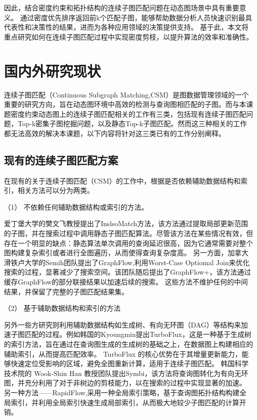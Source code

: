 因此，结合密度约束和拓扑结构的连续子图匹配问题在动态图场景中具有重要意义。
通过密度优先排序返回前k个匹配子图，能够帮助数据分析人员快速识别最具代表性和决策性的结果，进而为各种应用领域的决策提供支持。
基于此，本文将重点研究如何在连续子图匹配过程中实现密度剪枝，以提升算法的效率和准确性。
\section{国内外研究现状}
连续子图匹配（Continuous Subgraph Matching,CSM）是图数据管理领域的一个重要的研究方向，旨在动态图环境中高效的检测与查询图相匹配的子图。而与本课题密度约束动态图上的连续子图匹配相关的工作有三类，包括现有连续子图匹配问题，Top-k密集子图挖掘问题，以及静态Top-k子图匹配。然而这三种相关的工作都无法高效的解决本课题，以下内容将针对这三类已有的工作分别阐释。
\subsection{现有的连续子图匹配方案}
在现有的关于连续子图匹配（CSM）的工作\cite{csm-sjtree-DBLP:conf/edbt/ChoudhuryHCAF15,csm-IncIsoMatch-DBLP:conf/sigmod/FanLLTWW11,csm-graphflow-DBLP:conf/sigmod/KankanamgeSMCS17,csm-turboflux-DBLP:conf/sigmod/KimSHLHCSJ18,csm-graphflowpp-DBLP:journals/tods/MhedhbiKS21,csm-symbi-DBLP:journals/pvldb/MinPPGIH21,csm-rapidflow-DBLP:journals/pvldb/SunSHL22}中，根据是否依赖辅助数据结构和索引，相关方法可以分为两类。

（1） 不依赖任何辅助数据结构或索引的方法。

爱丁堡大学的樊文飞教授提出了InslsoMatch\cite{csm-IncIsoMatch-DBLP:conf/sigmod/FanLLTWW11}方法，该方法通过提取局部更新范围的子图，并在搜索过程中调用静态子图匹配算法。尽管该方法在某些情况有效，但存在一个明显的缺点：静态算法单次调用的查询延迟很高，因为它通常需要对整个图构建复杂索引或者进行全图遍历，从而使得查询复杂度高。
另一方面，加拿大滑铁卢大学的Semih团队提出了GraphFlow\cite{csm-graphflow-DBLP:conf/sigmod/KankanamgeSMCS17},利用Worst-Case Optiomal Join来优化搜索的过程，显著减少了搜索空间。该团队随后提出了GraphFlow+\cite{csm-graphflowpp-DBLP:journals/tods/MhedhbiKS21}，该方法通过缓存GraphFlow的部分联接结果以加速后续的搜索。
这些方法不维护任何的中间结果，并保留了完整的子图匹配结果集。

（2） 基于辅助数据结构和索引的方法

另外一些方研究则利用辅助数据结构如生成树、有向无环图（DAG）等结构来加速子图匹配的过程。例如韩国的Kyoungmin提出TurboFlux\cite{csm-turboflux-DBLP:conf/sigmod/KimSHLHCSJ18}，这是一种基于生成树的索引方法，旨在通过在查询图生成的生成树的基础之上，在数据图上构建相应的辅助索引，从而提高匹配效率。
TurboFlux 的核心优势在于其增量更新能力，能够快速定位受影响的区域，避免全图重新计算，适用于连续子图匹配。
韩国科学技术院的 Wook-Shin Han 教授团队提出Symbi\cite{csm-symbi-DBLP:journals/pvldb/MinPPGIH21}，该方法将查询图转化为有向无环图，并充分利用了对于非树边的剪枝能力，以在搜索的过程中实现显著的加速。
另一种方法——RapidFlow\cite{csm-rapidflow-DBLP:journals/pvldb/SunSHL22},采用一种全局索引策略，基于查询图拓扑结构构建全局索引，并利用全局索引快速生成局部索引，从而极大地较少子图匹配的计算开销。

